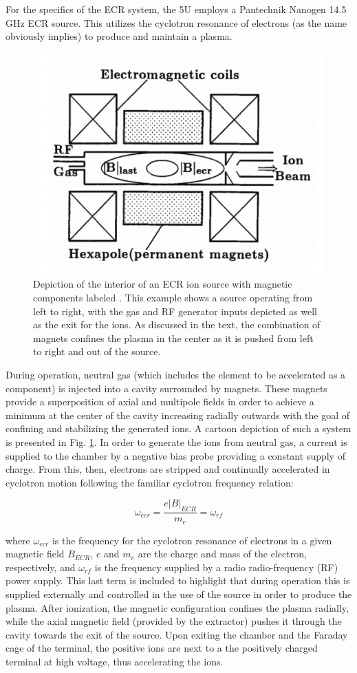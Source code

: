 For the specifics of the ECR system, the 5U employs a Pantechnik Nanogen 14.5 GHz ECR source. This utilizes the cyclotron resonance of electrons (as the name obviously implies) to produce and maintain a plasma.


\begin{figure}
\centering
\includegraphics[width=0.5\linewidth]{figures/ecrSchematic.png}
\caption{Depiction of the interior of an ECR ion source with magnetic components labeled \cite{Melin1997}. This example shows a source operating from left to right, with the gas and RF generator inputs depicted as well as the exit for the ions. As discussed in the text, the combination of magnets confines the plasma in the center as it is pushed from left to right and out of the source.}
\label{fig: ecris}
\end{figure}


During operation, neutral gas (which includes the element to be accelerated as a component) is injected into a cavity surrounded by magnets. These magnets provide a superposition of axial and multipole fields in order to achieve a minimum at the center of the cavity increasing radially outwards with the goal of confining and stabilizing the generated ions. A cartoon depiction of such a system is presented in Fig. \ref{fig: ecris}. In order to generate the ions from neutral gas, a current is supplied to the chamber by a negative bias probe providing a constant supply of charge. From this, then, electrons are stripped and continually accelerated in cyclotron motion following the familiar cyclotron frequency relation:

\begin{equation}
\omega_{ecr} = \dfrac{e | B |_{ECR}}{m_{e}} = \omega_{rf}
\label{eqn: ecr}
\end{equation}

\noindent where $\omega_{ecr}$ is the frequency for the cyclotron resonance of electrons in a given magnetic field $B_{ECR}$, $e$ and $m_{e}$ are the charge and mass of the electron, respectively, and $\omega_{rf}$ is the frequency supplied by a radio radio-frequency (RF) power supply. This last term is included to highlight that during operation this is supplied externally and controlled in the use of the source in order to produce the plasma. After ionization, the magnetic configuration confines the plasma radially, while the axial magnetic field (provided by the extractor) pushes it through the cavity towards the exit of the source. Upon exiting the chamber and the Faraday cage of the terminal, the positive ions are next to a the positively charged terminal at high voltage, thus accelerating the ions. 

